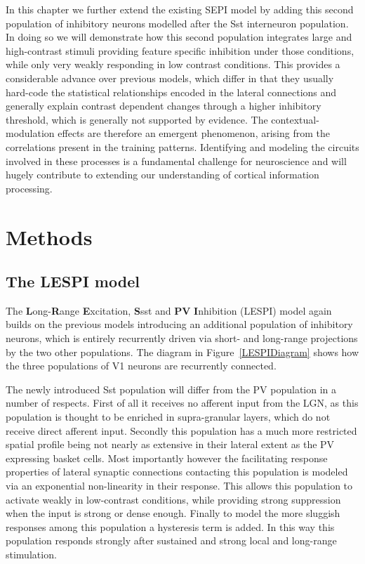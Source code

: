 In this chapter we further extend the existing SEPI model by adding
this second population of inhibitory neurons modelled after the Sst
interneuron population. In doing so we will demonstrate how this
second population integrates large and high-contrast stimuli providing
feature specific inhibition under those conditions, while only very
weakly responding in low contrast conditions. This provides a
considerable advance over previous models, which differ in that they
usually hard-code the statistical relationships encoded in the lateral
connections and generally explain contrast dependent changes through a
higher inhibitory threshold, which is generally not supported by
evidence. The contextual-modulation effects are therefore an emergent
phenomenon, arising from the correlations present in the training
patterns. Identifying and modeling the circuits involved in these
processes is a fundamental challenge for neuroscience and will hugely
contribute to extending our understanding of cortical information
processing.

\section{Methods}

\subsection{The LESPI model}

The \textbf{L}ong-\textbf{R}ange \textbf{E}xcitation, \textbf{S}sst
and \textbf{PV} \textbf{I}nhibition (LESPI) model again builds on the
previous models introducing an additional population of inhibitory
neurons, which is entirely recurrently driven via short- and
long-range projections by the two other populations. The diagram in
Figure~\ref{LESPIDiagram} shows how the three populations of V1
neurons are recurrently connected.

The newly introduced Sst population will differ from the PV population
in a number of respects. First of all it receives no afferent input
from the LGN, as this population is thought to be enriched in
supra-granular layers, which do not receive direct afferent
input. Secondly this population has a much more restricted spatial
profile being not nearly as extensive in their lateral extent as the
PV expressing basket cells. Most importantly however the facilitating
response properties of lateral synaptic connections contacting this
population is modeled via an exponential non-linearity in their
response. This allows this population to activate weakly in
low-contrast conditions, while providing strong suppression when the
input is strong or dense enough. Finally to model the more sluggish
responses among this population a hysteresis term is added. In this
way this population responds strongly after sustained and strong local
and long-range stimulation.

